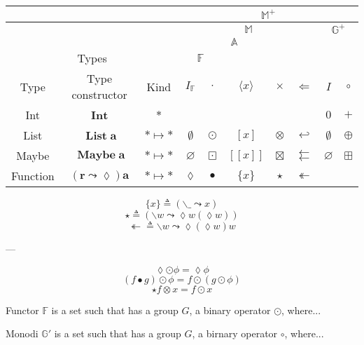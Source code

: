 \documentclass{jsarticle}
\def\[{[\![}
\def\]{]\!]}
\newcommand{\htypename}[1]{\mathbf{#1}}
\newcommand{\htypeclassname}[1]{\mathbb{#1}}
\newcommand{\identity}{I}
\newcommand{\binaryop}{\circ}
\newcommand{\inttypeconst}{\mathbf{Int}}
\newcommand{\listtype}[1]{[#1]}
\newcommand{\maybetype}[1]{\[#1\]}
\newcommand{\functype}[1]{\{#1\}}
\newcommand{\hrightarrow}{\leadsto}
\newcommand{\hlambdaparameter}{\lozenge}
\newcommand{\listtypeconst}[1]{\mathop{\htypename{List}}\htypename{#1}}
\newcommand{\maybetypeconst}[1]{\mathop{\htypename{Maybe}}\htypename{#1}}
\newcommand{\functypeconst}[1]{(\htypename{r}\hrightarrow\hlambdaparameter)\htypename{#1}}
\newcommand{\hfmap}{\cdot}
\newcommand{\hlistfmap}{\odot}
\newcommand{\hmaybefmap}{\boxdot}
\newcommand{\hfuncfmap}{\bullet}
\newcommand{\hemptylist}{\emptyset}
\newcommand{\hnothing}{\varnothing}
\newcommand{\hid}{\hlambdaparameter}
\newcommand{\hlambda}{\backslash}
\newcommand{\hlambdaparameterignore}{\_}
\newcommand{\hpure}[1]{\langle#1\rangle}
\newcommand{\hpurelist}[1]{\listtype{#1}}
\newcommand{\hpuremaybe}[1]{\maybetype{#1}}
\newcommand{\hpurefunc}[1]{\functype{#1}}
\newcommand{\hpurefuncimp}[1]{(\hlambda\hlambdaparameterignore\hrightarrow#1)}
\newcommand{\hafmap}{\times}
\newcommand{\hlistafmap}{\otimes}
\newcommand{\hmaybeafmap}{\boxtimes}
\newcommand{\hfuncafmap}{\star}
\newcommand{\hfuncafmapimp}[1]{(\hlambda#1\hrightarrow\hlambdaparameter#1(\hlambdaparameter#1))}
\newcommand{\hbind}{\Leftarrow}
\newcommand{\hlistbind}{\hookleftarrow}
\newcommand{\hmaybebind}{\leftleftarrows}
\newcommand{\hlistplus}{\oplus}
\newcommand{\hmaybeplus}{\boxplus}
\newcommand{\concretetype}{$\mathbf{*}$}
\newcommand{\functortype}{$\mathbf{*}\mapsto\mathbf{*}$}
\newcommand{\hmfbind}{\twoheadleftarrow}
\newcommand{\hmfbindimp}[1]{\hlambda#1\hrightarrow\hlambdaparameter(\hlambdaparameter#1)#1}
\begin{document}
\begin{center}
\begin{tabular}{||c|c|c||c|c|c|c|c|c|c||}
\hline
\multicolumn{3}{||c||}{ }
    &\multicolumn{7}{|c||}{$\htypeclassname{M}^+$}\\
\hline
\multicolumn{3}{||c||}{ }
    &\multicolumn{5}{|c|}{$\htypeclassname{M}$}
    &\multicolumn{2}{|c||}{$\htypeclassname{G}^+$}\\
\hline
\multicolumn{3}{||c||}{ }
    &\multicolumn{4}{|c|}{$\htypeclassname{A}$}
    &
    &\multicolumn{2}{|c||}{ }\\
\hline
\multicolumn{3}{||c||}{Types}
    &\multicolumn{2}{|c|}{$\htypeclassname{F}$}
    &\multicolumn{2}{|c|}{ }
    &
    &\multicolumn{2}{|c||}{ }\\
\hline
Type
    &Type constructor
    &Kind
    &$\identity_\htypeclassname{F}$
    &$\hfmap$
    &$\hpure{x}$
    &$\hafmap$
    &$\hbind$
    &$\identity$
    &$\binaryop$\\
\hline\hline
Int
    &$\inttypeconst$
    &\concretetype
    &
    &
    &
    &
    &
    &$0$
    &$+$\\
\hline
List
    &$\listtypeconst{a}$
    &\functortype
    &$\hemptylist$
    &$\hlistfmap$
    &$\hpurelist{x}$
    &$\hlistafmap$
    &$\hlistbind$
    &$\hemptylist$
    &$\hlistplus$\\
\hline
Maybe
    &$\maybetypeconst{a}$
    &\functortype
    &$\hnothing$
    &$\hmaybefmap$
    &$\hpuremaybe{x}$
    &$\hmaybeafmap$
    &$\hmaybebind$
    &$\hnothing$
    &$\hmaybeplus$\\
\hline
Function
    &$\functypeconst{a}$
    &\functortype
    &$\hid$
    &$\hfuncfmap$
    &$\hpurefunc{x}$
    &$\hfuncafmap$
    &$\hmfbind$
    &
    &\\
\hline
\end{tabular}
\end{center}

$$\hpurefunc{x}\triangleq\hpurefuncimp{x}$$
$$\hfuncafmap\triangleq\hfuncafmapimp{w}$$
$$\hmfbind\triangleq\hmfbindimp{w}$$

---

$$\lozenge\odot\phi=\lozenge\phi$$
$$(f\bullet g)\odot\phi=f\odot(g\odot\phi)$$
$$\star f\otimes x=f\odot x$$


Functor $\htypeclassname{F}$ is a set such that has a group $G$, a binary operator $\odot$, where...

Monodi $\htypeclassname{G}'$ is a set such that has a group $G$, a birnary operator $\circ$, where...
\end{document}
